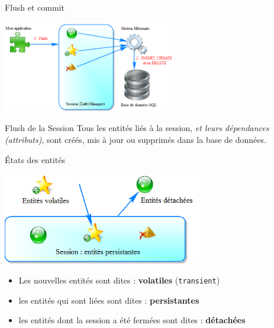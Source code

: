 \documentclass[compact]{beamer}%
\begin{document}
\begin{frame}{Flush et commit}
	
	\begin{center}
	\includegraphics[height=4cm]{images/with_orm_flush.png}	
	\end{center}
	
	\begin{block}{Flush de la Session}
	Tous les entités liés à la session, \emph{et leurs dépendances (attributs)}, sont créés, mis à jour ou supprimés dans la base de données.\\
	\end{block}
	
\end{frame}

\begin{frame}{États des entités}
	
	\begin{center}
	\includegraphics[height=4cm]{images/entities_states.png}	
	\end{center}
	
	\pause
	\begin{itemize}[<+->]
	\item Les nouvelles entités sont dites : \textbf{volatiles} (\texttt{transient})
	\item les entités qui sont liées sont dites : \textbf{persistantes}
	\item les entités dont la session a été fermées sont dites : \textbf{détachées}
	\end{itemize}

\end{frame}
\end{document}
